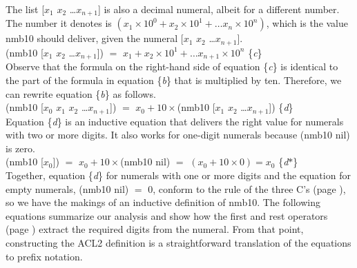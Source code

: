 The list \textsf{[$x_1$ $x_2$ \dots $x_{n+1}$]} is also a decimal numeral,
albeit for a different number.
The number it denotes is
$(x_1 \times 10^0 + x_2 \times 10^1 + \dots x_n \times 10^n)$,
which is the value \textsf{nmb10} should deliver, given the numeral \textsf{[$x_1$ $x_2$ \dots $x_{n+1}$]}.\\
\hspace*{1cm}
\textsf{(nmb10 [$x_1$ $x_2$ \dots $x_{n+1}$])} $=$ $x_1 + x_2 \times 10^1 + \dots x_{n+1} \times 10^n$ \hfill \{\emph{c}\}\\

Observe that the formula on the right-hand side of equation \{\emph{c}\}
is identical
to the part of the formula in equation \{\emph{b}\} that is multiplied by ten.
Therefore, we can rewrite equation \{\emph{b}\} as follows.\\
\hspace*{1cm}
\textsf{(nmb10 [$x_0$ $x_1$ $x_2$ \dots $x_{n+1}$])} $=$
$x_0 + 10 \times$\textsf{(nmb10 [$x_1$ $x_2$ \dots $x_{n+1}$])} \hfill \{\emph{d}\}\\

Equation \{\emph{d}\} is an inductive equation that delivers the right value for
numerals with two or more digits. It also works
for one-digit numerals because (nmb10 nil) is zero.\\
\hspace*{1cm}
\textsf{(nmb10 [$x_0$])} $=$ $x_0 + 10 \times$\textsf{(nmb10 nil)} $=$ $(x_0 + 10 \times 0) = x_0$ \hfill \{\emph{d}$*$\}\\

Together, equation \{\emph{d}\} for numerals with one or more digits
and the equation for empty numerals, \textsf{(nmb10 nil)} $=$ $0$, conform to the
rule of the three C's (page \pageref{fig:inductive-def-keys}),
so we have the makings of an inductive definition of \textsf{nmb10}.
The following equations summarize our analysis and show how
the \textsf{first} and \textsf{rest} operators
(page \pageref{first-rest-cons})
extract the required digits from the numeral.
From that point, constructing the ACL2 definition
is a straightforward translation of the equations to prefix notation.

